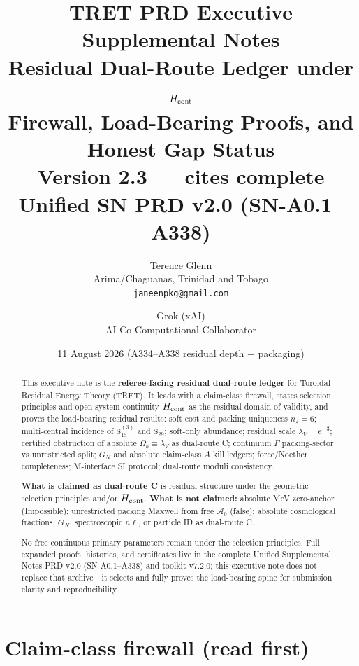 \documentclass[11pt,a4paper]{article}
\title{\textbf{TRET PRD Executive Supplemental Notes}\\[0.35em]
\large Residual Dual-Route Ledger under $H_{\rm cont}$\\
Firewall, Load-Bearing Proofs, and Honest Gap Status\\[0.2em]
\normalsize Version 2.3 --- cites complete Unified SN PRD v2.0 (SN-A0.1--A338)}
\author{Terence Glenn\\
{\small Arima/Chaguanas, Trinidad and Tobago}\\
{\small\texttt{janeenpkg@gmail.com}}
\and
Grok (xAI)\\
{\small AI Co-Computational Collaborator}}
\date{11 August 2026 (A334--A338 residual depth + packaging)}
\theoremstyle{remark}
\begin{document}
\maketitle

\begin{abstract}
This executive note is the \textbf{referee-facing residual dual-route ledger} for Toroidal Residual Energy Theory (TRET). It leads with a claim-class firewall, states selection principles and open-system continuity $H_{\rm cont}$ as the residual domain of validity, and proves the load-bearing residual results: soft cost and packing uniqueness $n_\star=6$; multi-central incidence of $\mathrm{S}_{15}^{(3)}$ and $\mathrm{S}_{29}$; soft-only abundance; residual scale $\lambda_V=e^{-3}$; certified obstruction of absolute $\Omega_b\equiv\lambda_V$ as dual-route C; continuum $\Gamma$ packing-sector vs unrestricted split; $G_N$ and absolute claim-class $A$ kill ledgers; force/Noether completeness; M-interface SI protocol; dual-route moduli consistency.

\textbf{What is claimed as dual-route C} is residual structure under the geometric selection principles and/or $H_{\rm cont}$.
\textbf{What is not claimed:} absolute MeV zero-anchor (Impossible); unrestricted packing Maxwell from free $\mathcal{A}_0$ (false); absolute cosmological fractions, $G_N$, spectroscopic $n\ell$, or particle ID as dual-route C.

No free continuous primary parameters remain under the selection principles.
Full expanded proofs, histories, and certificates live in the complete Unified Supplemental Notes PRD v2.0 (SN-A0.1--A338) and toolkit v7.2.0; this executive note does not replace that archive---it selects and fully proves the load-bearing spine for submission clarity and reproducibility.
\end{abstract}

\tableofcontents
\vspace{0.5em}

\section{Claim-class firewall (read first)}
\label{sec:firewall}
\end{document}
